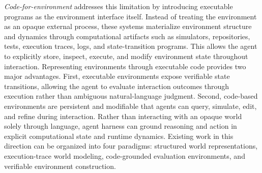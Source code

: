 \textit{Code-for-environment} addresses this limitation by
introducing executable programs as the environment interface
itself.
Instead of treating the environment as an opaque external process,
these systems materialize environment structure and dynamics
through computational artifacts such as simulators,
repositories, tests, execution traces, logs, and state-transition
programs.
This allows the agent to explicitly store, inspect, execute,
and modify environment state throughout interaction.
Representing environments through executable code provides two
major advantages.
First, executable environments expose verifiable state
transitions, allowing the agent to evaluate interaction
outcomes through execution rather than ambiguous natural-language
judgment.
Second, code-based environments are persistent and
modifiable that agents can query, simulate, edit,
and refine during interaction.
Rather than interacting with an opaque world solely through language, agent harness can ground reasoning and action in explicit computational state and runtime dynamics. 
Existing work in this direction can be organized into four
paradigms: structured world representations, execution-trace world
modeling, code-grounded evaluation environments, and verifiable
environment construction.

